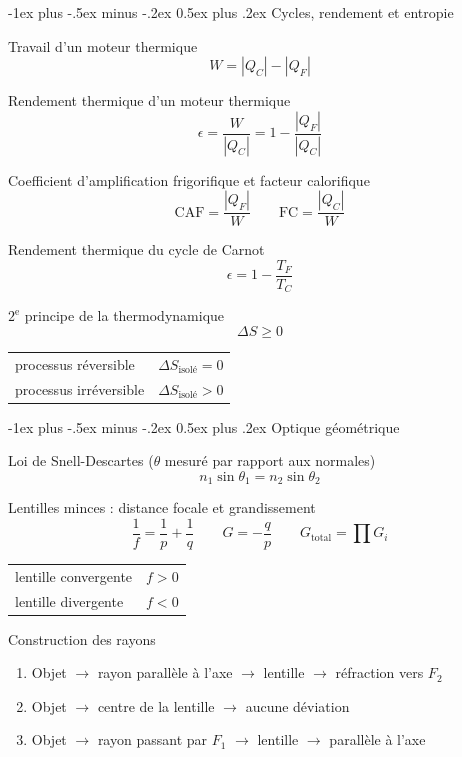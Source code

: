 \documentclass[10pt,landscape]{article}
\makeatletter
\renewcommand{\section}{\@startsection{section}{1}{0mm}%
                                {-1ex plus -.5ex minus -.2ex}%
                                {0.5ex plus .2ex}%
                                {\normalfont\large\bfseries}}
\newcommand{\halfline}{\vspace{0.5em}}
\newcommand{\tableindent}{\hspace{1.5em}}
\makeatother
\begin{document}
\begin{multicols}{3}
\hrulefill

\section{Cycles, rendement et entropie}

Travail d'un moteur thermique
\[ W = |Q_C| - |Q_F| \]

Rendement thermique d'un moteur thermique
\[ \epsilon=\frac{W}{|Q_C|} = 1 - \frac{|Q_F|}{|Q_C|} \]

Coefficient d'amplification frigorifique et facteur calorifique
\[ \text{CAF} = \frac{|Q_F|}{W} \qquad
\text{FC} = \frac{|Q_C|}{W} \]

Rendement thermique du cycle de Carnot
\[ \epsilon= 1- \frac{T_F}{T_C} \]

$2^\text{e}$ principe de la thermodynamique
\[ \Delta S \geq 0 \]

\begin{tabular}{@{\tableindent}ll}
	processus réversible & $\Delta S_\text{isolé} = 0$ \\
	processus irréversible & $\Delta S_\text{isolé} > 0$ \\
\end{tabular}
\halfline

\hrulefill


\section{Optique géométrique}

Loi de Snell-Descartes {($\theta$ mesuré par rapport aux normales)}
\[ n_1 \sin\theta_1 = n_2 \sin\theta_2
\]

Lentilles minces : distance focale et grandissement
\[ \frac{1}{ f} = \frac{1}{p} + \frac{1}{q}
\qquad G = -\frac{q}{p} 
\qquad G_\text{total} = \prod G_i
\]

\begin{tabular}{@{\tableindent}ll}
	lentille convergente & $f>0$ \\
	lentille divergente & $f<0$ \\
\end{tabular}
\halfline


Construction des rayons
\begin{enumerate}
	\item Objet $\rightarrow$ rayon parallèle à l'axe $\rightarrow$ lentille $\rightarrow$ réfraction vers $F_2$
	\item Objet $\rightarrow$ centre de la lentille $\rightarrow$ aucune déviation
	\item Objet $\rightarrow$ rayon passant par $F_1$ $\rightarrow$ lentille $\rightarrow$ parallèle à l'axe
\end{enumerate}


\end{multicols}
\end{document}
